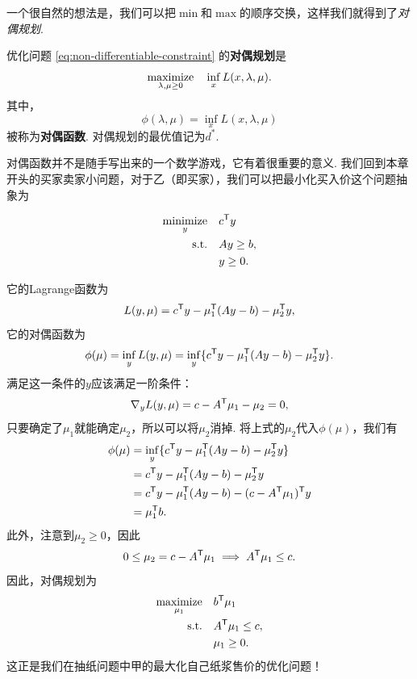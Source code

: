 一个很自然的想法是，我们可以把$\min$和$\max$的顺序交换，这样我们就得到了\textit{对偶规划}.

\begin{definition}[对偶规划和对偶函数]
    优化问题 \eqref{eq:non-differentiable-constraint} 的\textbf{对偶规划}是
    \[\operatorname*{maximize}_{\lambda,\mu\geq 0}\quad \inf_{x} L(x,\lambda,\mu).\]
    其中，
    \[\phi(\lambda,\mu)=\inf_{x} L(x,\lambda,\mu)\]
    被称为\textbf{对偶函数}. 对偶规划的最优值记为$d^*$.
\end{definition}

对偶函数并不是随手写出来的一个数学游戏，它有着很重要的意义. 我们回到本章开头的买家卖家小问题，对于乙（即买家），我们可以把最小化买入价这个问题抽象为

\begin{equation}
\begin{aligned}
    \operatorname*{minimize}_y\quad& c^{\mathsf{T}} y \\
    \text{s.t.}\quad& Ay\geq b,\\
    & y\geq 0.
\end{aligned}\label{eq:linear-programming}
\end{equation}

它的Lagrange函数为
\[L(y,\mu)=c^{\mathsf{T}} y-\mu_1^{\mathsf{T}} (Ay-b)-\mu_2^{\mathsf{T}} y,\]
它的对偶函数为
\[\phi(\mu)=\inf_{y} L(y,\mu)=\inf_{y}\{c^{\mathsf{T}} y-\mu_1^{\mathsf{T}} (Ay-b)-\mu_2^{\mathsf{T}} y\}.\]
满足这一条件的$y$应该满足一阶条件：
\[\nabla_y L(y,\mu)=c-A^{\mathsf{T}} \mu_1-\mu_2=0,\]
只要确定了$\mu_1$就能确定$\mu_2$，所以可以将$\mu_2$消掉. 将上式的$\mu_2$代入$\phi(\mu)$，我们有
\begin{align*}
    \phi(\mu)&=\inf_{y}\{c^{\mathsf{T}} y-\mu_1^{\mathsf{T}} (Ay-b)-\mu_2^{\mathsf{T}} y\}\\
    &=c^{\mathsf{T}} y-\mu_1^{\mathsf{T}} (Ay-b)-\mu_2^{\mathsf{T}} y\\
    &=c^{\mathsf{T}} y-\mu_1^{\mathsf{T}} (Ay-b)-(c-A^{\mathsf{T}} \mu_1)^{\mathsf{T}} y\\
    &=\mu_1^{\mathsf{T}} b.
\end{align*}
此外，注意到$\mu_2\geq 0$，因此
\[
    0\leq \mu_2=c-A^{\mathsf{T}} \mu_1\implies A^{\mathsf{T}} \mu_1\leq c.
\]
因此，对偶规划为
\begin{equation}
\begin{aligned}
    \operatorname*{maximize}_{\mu_1}\quad& b^{\mathsf{T}} \mu_1 \\
    \text{s.t.}\quad& A^{\mathsf{T}} \mu_1\leq c,\\
    & \mu_1\geq 0.
\end{aligned}\label{eq:linear-programming-dual}
\end{equation}
这正是我们在抽纸问题中甲的最大化自己纸浆售价的优化问题！

